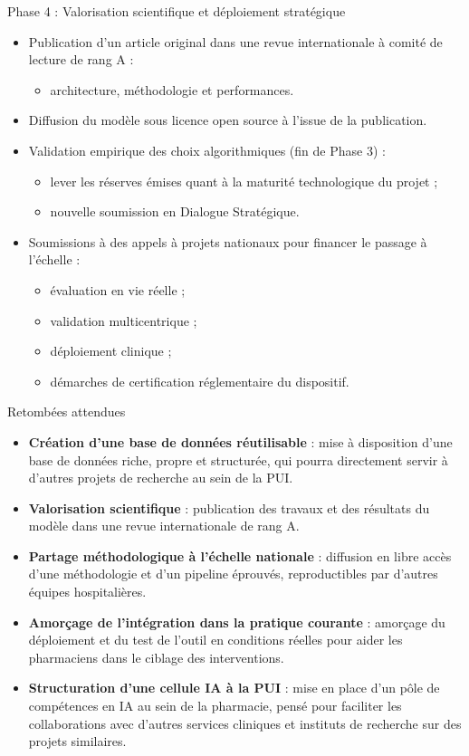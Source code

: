 \documentclass{beamer}
\begin{document}
\begin{frame}{Phase 4 : Valorisation scientifique et déploiement stratégique}
  \small
  \begin{itemize}
    \item Publication d'un article original dans une revue internationale à comité de lecture de rang A :
      \begin{itemize}
        \item architecture, méthodologie et performances.
      \end{itemize}
    \item Diffusion du modèle sous licence open source à l'issue de la publication.
    \item Validation empirique des choix algorithmiques (fin de Phase 3) :
      \begin{itemize}
        \item lever les réserves émises quant à la maturité technologique du projet ;
        \item nouvelle soumission en Dialogue Stratégique.
      \end{itemize}
    \item Soumissions à des appels à projets nationaux pour financer le passage à l'échelle :
      \begin{itemize}
        \item évaluation en vie réelle ;
        \item validation multicentrique ;
        \item déploiement clinique ;
        \item démarches de certification réglementaire du dispositif.
      \end{itemize}
  \end{itemize}
\end{frame}

\begin{frame}{Retombées attendues}
  \small
  \begin{itemize}
    \item \textbf{Création d'une base de données réutilisable} : mise à disposition d'une base de données riche, propre et structurée, qui pourra directement servir à d'autres projets de recherche au sein de la PUI.
    \item \textbf{Valorisation scientifique} : publication des travaux et des résultats du modèle dans une revue internationale de rang A.
    \item \textbf{Partage méthodologique à l'échelle nationale} : diffusion en libre accès d'une méthodologie et d'un pipeline éprouvés, reproductibles par d'autres équipes hospitalières.
    \item \textbf{Amorçage de l'intégration dans la pratique courante} : amorçage du déploiement et du test de l'outil en conditions réelles pour aider les pharmaciens dans le ciblage des interventions.
    \item \textbf{Structuration d'une cellule IA à la PUI} : mise en place d'un pôle de compétences en IA au sein de la pharmacie, pensé pour faciliter les collaborations avec d'autres services cliniques et instituts de recherche sur des projets similaires.
  \end{itemize}
\end{frame}
\end{document}
